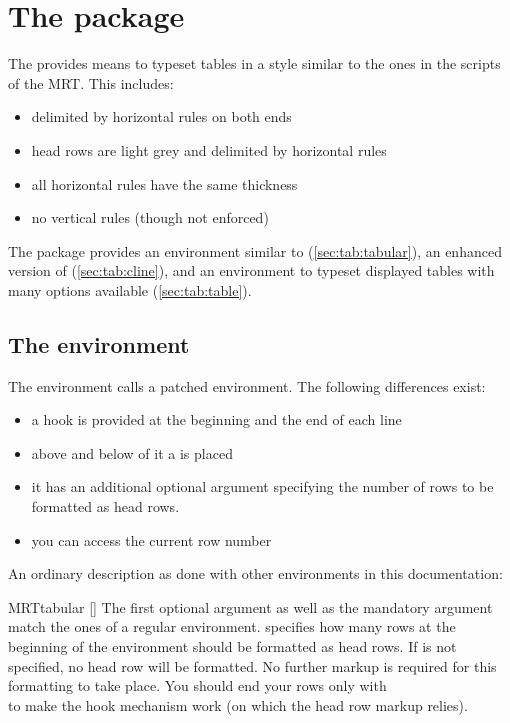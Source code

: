 \chapter{The  package}
The  provides means to typeset tables in a style similar to the ones
in the scripts of the MRT. This includes:
\begin{itemize}
  \item delimited by horizontal rules on both ends
  \item head rows are light grey and delimited by horizontal rules
  \item all horizontal rules have the same thickness
  \item no vertical rules (though not enforced)
\end{itemize}

The package provides an environment similar to 
(\autoref{sec:tab:tabular}), an enhanced version of 
(\autoref{sec:tab:cline}), and an environment to typeset displayed tables with
many options available (\autoref{sec:tab:table}).

\section{The  environment}\label{sec:tab:tabular}%
The  environment calls a patched  environment. The
following differences exist:
\begin{itemize}
  \item a hook is provided at the beginning and the end of each line 
  \item above and below of it a  is placed
  \item it has an additional optional argument specifying the number of rows to
    be formatted as head rows.
  \item you can access the current row number
\end{itemize}
An ordinary description as done with other environments in this documentation:
\begin{describeenv}{MRTtabular}%
  []
  The first optional argument as well as the mandatory argument match the ones
  of a regular  environment.  specifies how many
  rows at the beginning of the environment should be formatted as head rows. If
   is not specified, no head row will be formatted. No
  further markup is required for this formatting to take place. You should end
  your rows only with \texttt{\string\\} to make the hook mechanism work (on
  which the head row markup relies).
\end{describeenv}%

